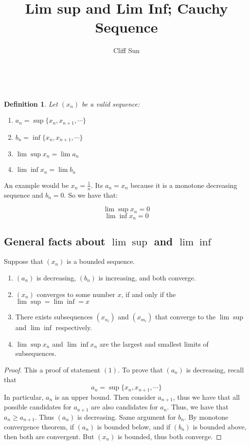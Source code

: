 \documentclass{article}
\title{Lim sup and Lim Inf; Cauchy Sequence}
\author{Cliff Sun}
\newtheorem{definition}[theorem]{Definition}
\newtheorem{one minute paper}[theorem]{One Minute Paper}
\begin{document}
\maketitle\

\begin{definition}
    Let $(x_n)$ be a valid sequence:
    \begin{enumerate}
        \item $a_n = \sup\{x_n, x_{n+1}, \cdots\}$
        \item $b_n = \inf\{x_n, x_{n+1}, \cdots \}$
        \item $\lim \sup x_n = \lim a_n$
        \item $\lim \inf x_n = \lim b_n$
    \end{enumerate}
\end{definition}

An example would be $x_n = \frac{1}{n}$. Its $a_n = x_n$ because it is a monotone decreasing sequence and $b_n = 0$. So we have that:

\begin{equation}
    \lim \sup x_n = 0
\end{equation}
\begin{equation}
    \lim \inf x_n = 0
\end{equation}

\subsection*{General facts about $\lim \sup$ and $\lim \inf$}

Suppose that $(x_n)$ is a bounded sequence. 

\begin{enumerate}
    \item $(a_n)$ is decreasing, $(b_n)$ is increasing, and both converge. 
    \item $(x_n)$ converges to some number $x$, if and only if the $\lim \sup = \lim \inf = x$ 
    \item There exists subsequences $(x_{n_i})$ and $(x_{m_i})$ that converge to the $\lim \sup$ and $\lim \inf$ respectively. 
    \item $\lim \sup x_n$ and $\lim \inf x_n$ are the largest and smallest limits of subsequences. 
\end{enumerate}

\begin{proof}
    This a proof of statement $(1)$. To prove that $(a_n)$ is decreasing, recall that 
    \begin{equation}
        a_n = \sup\{x_n, x_{n+1}, \cdots\}
    \end{equation}
    In particular, $a_n$ is an upper bound. Then consider $a_{n+1}$, thus we have that all possible candidates for $a_{n+1}$ are also candidates for $a_{n}$. Thus, we have that 
    $a_n \geq a_{n+1}$. Thus $(a_n)$ is decreasing. Same argument for $b_n$. By monotone convergence theorem, if $(a_n)$ is bounded below, and if $(b_n)$ is bounded above, then both are convergent. But $(x_n)$ is bounded, thus both converge. 
\end{proof}
\end{document}
